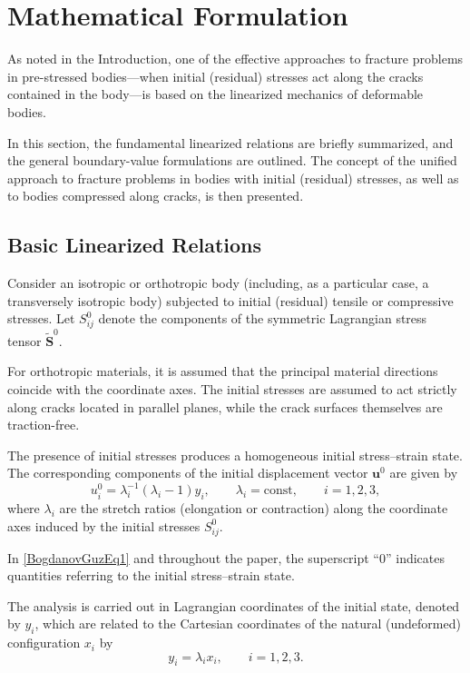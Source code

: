 \section{Mathematical Formulation}
\label{BogdanovGuzSec2}

As noted in the Introduction, one of the effective approaches to fracture problems in pre-stressed bodies—when initial (residual) stresses act along the cracks contained in the body—is based on the linearized mechanics of deformable bodies. 

In this section, the fundamental linearized relations are briefly summarized, and the general boundary-value formulations are outlined. The concept of the unified approach to fracture problems in bodies with initial (residual) stresses, as well as to bodies compressed along cracks, is then presented.

\subsection{Basic Linearized Relations}

Consider an isotropic or orthotropic body (including, as a particular case, a transversely isotropic body) subjected to initial (residual) tensile or compressive stresses. Let $S_{ij}^{0}$ denote the components of the symmetric Lagrangian stress tensor $\tilde{\mathbf{S}}^{0}$. 

For orthotropic materials, it is assumed that the principal material directions coincide with the coordinate axes. The initial stresses are assumed to act strictly along cracks located in parallel planes, while the crack surfaces themselves are traction-free.

The presence of initial stresses produces a homogeneous initial stress--strain state. The corresponding components of the initial displacement vector $\mathbf{u}^{0}$ are given by
\begin{equation}
	\label{BogdanovGuzEq1}
	u_i^{0} = \lambda_i^{-1}(\lambda_i - 1) y_i, 
	\qquad \lambda_i = \text{const}, 
	\qquad i = 1,2,3,
\end{equation}
where $\lambda_i$ are the stretch ratios (elongation or contraction) along the coordinate axes induced by the initial stresses $S_{ij}^{0}$. 

In \eqref{BogdanovGuzEq1} and throughout the paper, the superscript “$0$” indicates quantities referring to the initial stress--strain state.

The analysis is carried out in Lagrangian coordinates of the initial state, denoted by $y_i$, which are related to the Cartesian coordinates of the natural (undeformed) configuration $x_i$ by
\[
y_i = \lambda_i x_i, \qquad i = 1,2,3.
\]

